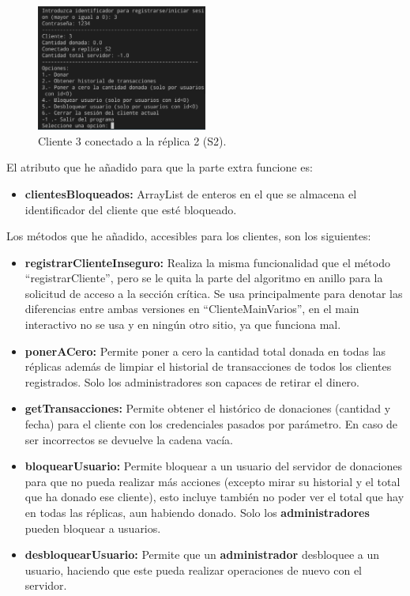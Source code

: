 \documentclass{article}
\begin{document}
\begin{figure}[H]
    \centering
    \includegraphics[width=0.5\textwidth]{imagenes/3replicasS2.png}
    \caption{Cliente 3 conectado a la réplica 2 (S2).}
\end{figure}

\newpage

El atributo que he añadido para que la parte extra funcione es:

\begin{itemize}
    \item \textbf{clientesBloqueados: }ArrayList de enteros en el que se almacena el identificador del cliente que esté bloqueado.
\end{itemize}

\bigskip

Los métodos que he añadido, accesibles para los clientes, son los siguientes:

\begin{itemize}
    \item \textbf{registrarClienteInseguro: }Realiza la misma funcionalidad que el método ``registrarCliente'', pero se le quita la parte del algoritmo en anillo para la solicitud de acceso a la sección crítica. Se usa principalmente para denotar las diferencias entre ambas versiones en ``ClienteMainVarios'', en el main interactivo no se usa y en ningún otro sitio, ya que funciona mal.
    \item \textbf{ponerACero: }Permite poner a cero la cantidad total donada en todas las réplicas además de limpiar el historial de transacciones de todos los clientes registrados. Solo los administradores son capaces de retirar el dinero.
    \item \textbf{getTransacciones: }Permite obtener el histórico de donaciones (cantidad y fecha) para el cliente con los credenciales pasados por parámetro. En caso de ser incorrectos se devuelve la cadena vacía.
    \item \textbf{bloquearUsuario: }Permite bloquear a un usuario del servidor de donaciones para que no pueda realizar más acciones (excepto mirar su historial y el total que ha donado ese cliente), esto incluye también no poder ver el total que hay en todas las réplicas, aun habiendo donado. Solo los \textbf{administradores} pueden bloquear a usuarios.
    \item \textbf{desbloquearUsuario: }Permite que un \textbf{administrador} desbloquee a un usuario, haciendo que este pueda realizar operaciones de nuevo con el servidor.
\end{itemize}
\end{document}
